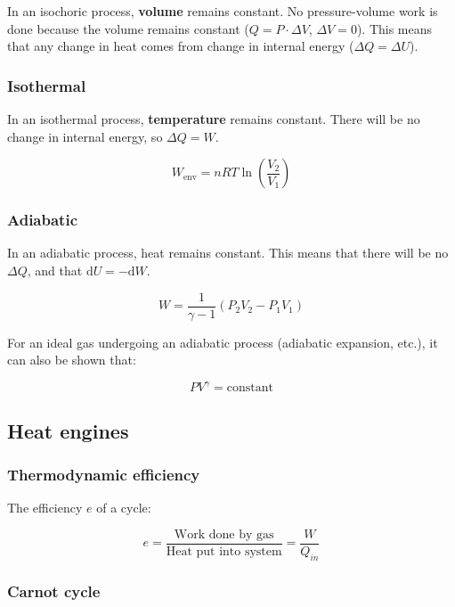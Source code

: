 \documentclass[12pt]{article}
\begin{document}
In an isochoric process, \textbf{volume} remains constant. No pressure-volume work is done because the volume remains constant ($Q = P\cdot\Delta V$, $\Delta V = 0$). This means that any change in heat comes from change in internal energy ($\Delta Q = \Delta U$).

\subsubsection{Isothermal}

In an isothermal process, \textbf{temperature} remains constant. There will be no change in internal energy, so $\Delta Q = W$.

\[
\boxed{
W_{\text{env}} = nRT\ln\left(\frac{V_2}{V_1}\right)
}
\]

\subsubsection{Adiabatic}

In an adiabatic process, heat remains constant. This means that there will be no $\Delta Q$, and that $\mathrm{d}U = -\mathrm{d}W$.

\[
\boxed{
W = \frac{1}{\gamma - 1}(P_2 V_2 - P_1 V_1)
}
\]


For an ideal gas undergoing an adiabatic process (adiabatic expansion, etc.), it can also be shown that:

\[
\boxed{
PV^\gamma = \text{constant}
}
\]

\newpage

\subsection{Heat engines}

\subsubsection{Thermodynamic efficiency}

The efficiency $e$ of a cycle:

\[
e = \frac{\text{Work done by gas}}{\text{Heat put into system}} = \boxed{\frac{W}{Q_{in}}}
\]

\subsubsection{Carnot cycle}
\end{document}

